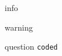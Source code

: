 \begin{Information}
info
\end{Information}
\begin{Warning}
warning
\end{Warning}
\begin{Question}
question \texttt{coded}
\end{Question}
